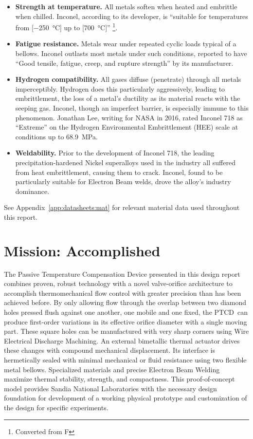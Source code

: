 \documentclass[12pt, letterpaper]{report}%
\newcommand{\device}{PTCD}
\begin{document}
				\begin{itemize}
					\item \textbf{Strength at temperature.} All metals soften when heated and embrittle when chilled. Inconel, according to its developer, is ``suitable for temperatures from [\SI{-250}{\celsius}] up to [\SI{700}{\celsius}]''%
						\footnote{Converted from \textdegree F}\cite[p.~62, 74--76]{ref_Inconel_1965}.
					\item \textbf{Fatigue resistance.} Metals wear under repeated cyclic loads typical of a bellows. Inconel outlasts most metals under such conditions, reported to have ``Good tensile, fatigue, creep, and rupture strength'' by its manufacturer\cite[p.~1]{ref_SpecialMetals_Inc}.
					\item \textbf{Hydrogen compatibility.} All gases diffuse (penetrate) through all metals imperceptibly. Hydrogen does this particularly aggressively, leading to embrittlement, the loss of a metal's ductility as its material reacts with the seeping gas.
						Inconel, though an imperfect barrier, is especially immune to this phenomenon. Jonathan Lee, writing for NASA in 2016\cite[Table~4]{ref_NASA_Inc}, rated Inconel 718 as ``Extreme'' on the Hydrogen Environmental Embrittlement (HEE) scale at conditions up to \SI{68.9}{\mega\pascal}.
					\item \textbf{Weldability.} Prior to the development of Inconel 718, the leading precipitation-hardened Nickel superalloys used in the industry all suffered from heat embrittlement, causing them to crack. Inconel, found to be particularly suitable for Electron Beam welds, drove the alloy's industry dominance.
				\end{itemize}

				See Appendix~\ref{app:datasheets:mat} for relevant material data used throughout this report.

\chapter{Mission: Accomplished}
\label{chap:concl}

	The Passive Temperature Compensation Device presented in this design report combines proven, robust technology with a novel valve-orifice architecture
	to accomplish thermomechanical flow control with greater precision than has been achieved before.
	By only allowing flow through the overlap between two diamond holes pressed flush against one another, one mobile and one fixed,
	the \device\ can produce first-order variations in its effective orifice diameter with a single moving part.
	These square holes can be manufactured with very sharp corners using Wire Electrical Discharge Machining.
	An external bimetallic thermal actuator drives these changes with compound mechanical displacement.
	Its interface is hermetically sealed with minimal mechanical or fluid resistance using two flexible metal bellows.
	Specialized materials and precise Electron Beam Welding maximize thermal stability, strength, and compactness.
	This proof-of-concept model provides Sandia National Laboratories with the necessary design foundation for development of a working physical prototype
	and customization of the design for specific experiments.
\end{document}
